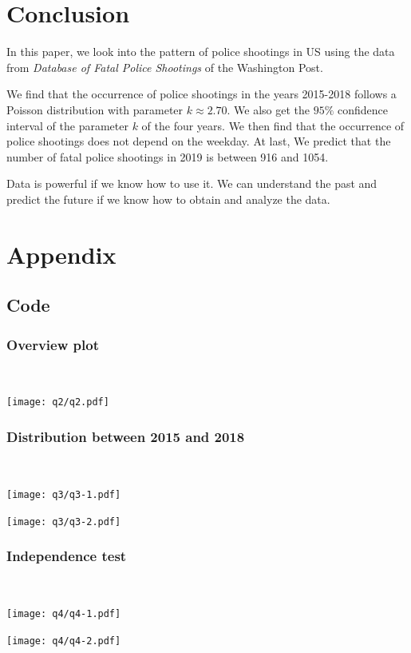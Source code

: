 \documentclass[conf]{new-aiaa}
\begin{document}
\newpage

\section{Conclusion}
In this paper, we look into the pattern of police shootings in US using the data from \textit{Database of Fatal Police Shootings} of the Washington Post.

We find that the occurrence of police shootings in the years 2015-2018 follows a Poisson distribution with parameter $k\approx2.70$. We also get the $95\%$ confidence interval of the parameter $k$ of the four years. We then find that the occurrence of police shootings does not depend on the weekday. At last, We predict that the number of fatal police shootings in 2019 is between 916 and 1054.

Data is powerful if we know how to use it. We can understand the past and predict the future if we know how to obtain and analyze the data.
\newpage

\section{Appendix}

\subsection{Code}

\subsubsection{Overview plot}~

\texttt{[image: q2/q2.pdf]}

\subsubsection{Distribution between 2015 and 2018}~

\texttt{[image: q3/q3-1.pdf]}

\texttt{[image: q3/q3-2.pdf]}

\newpage

\subsubsection{Independence test}~

\texttt{[image: q4/q4-1.pdf]}

\texttt{[image: q4/q4-2.pdf]}
\end{document}
